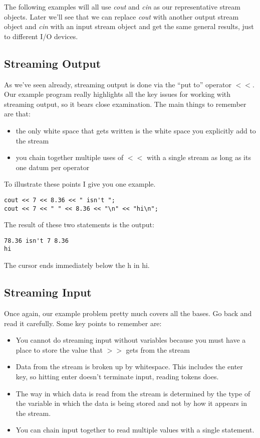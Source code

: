 \documentclass[]{tufte-handout}
\begin{document}
The following examples will all use \textit{cout} and \textit{cin} as our representative stream objects. Later we'll see that we can replace \textit{cout} with another output stream object and \textit{cin} with an input stream object and get the same general results, just to different I/O devices.

\subsection{Streaming Output}

As we've seen already, streaming output is done via the ``put to'' operator \textit{$<<$}. Our example program really highlights all the key issues for working with streaming output, so it bears close examination. The main things to remember are that:
\begin{itemize}
\item the only white space that gets written is the white space you explicitly add to the stream
\item you chain together multiple uses of $<<$ with a single stream as long as its one datum per operator
\end{itemize}
To illustrate these points I give you one example. 
\begin{verbatim}
cout << 7 << 8.36 << " isn't ";
cout << 7 << " " << 8.36 << "\n" << "hi\n";
\end{verbatim}
The result of these two statements is the output:
\begin{verbatim}
78.36 isn't 7 8.36
hi

\end{verbatim}
The cursor ends immediately below the h in hi. 

\subsection{Streaming Input}

Once again, our example problem pretty much covers all the bases. Go back and read it carefully. Some key points to remember are: 
\begin{itemize}
\item You cannot do streaming input without variables because you must have a place to store the value that $>>$ gets from the stream
\item Data from the stream is broken up by whitespace. This includes the enter key, so hitting enter doesn't terminate input, reading tokens does.
\item The way in which data is read from the stream is determined by the type of the variable in which the data is being stored and not by how it appears in the stream. 
\item You can chain input together to read multiple values with a single statement.
\end{itemize}
\end{document}
